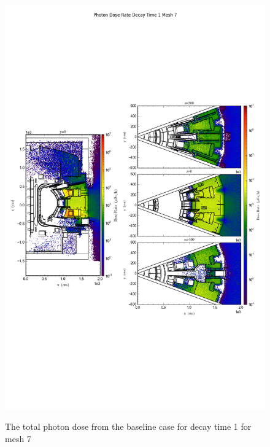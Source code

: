 \begin{figure}[ht!]
\centering
\includegraphics[trim={0cm 9cm 0cm 10cm},clip,scale=0.75]{../plots/final_model/Photon_Dose_Rate_Decay_Time_1_Mesh_7.png}
\label{fig:photons_dc1_no4bc_m7_flux}
\caption{The total photon dose from the baseline case for decay time 1 for mesh 7}
\end{figure}
